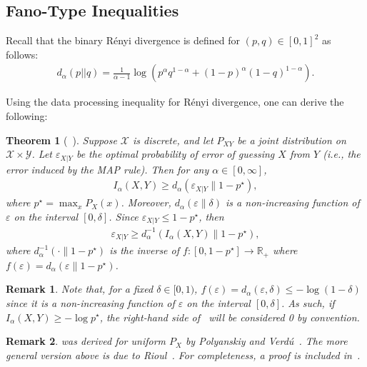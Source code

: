 \documentclass{article}
\newtheorem{theorem}{Theorem}
\numberwithin{theorem}{section}
\numberwithin{example}{section}
\newtheorem{remark}{Remark}
\numberwithin{remark}{section}
\numberwithin{definition}{section}
\newcommand{\X}{\mathcal{X}}
\newcommand{\Y}{\mathcal{Y}}
\newcommand{\eps}{\varepsilon}
\begin{document}
\subsection{Fano-Type Inequalities}\label{sec:fanoTypeIneq}

Recall that the binary R\'enyi divergence is defined for $(p,q) \in [0,1]^2$ as follows:
\begin{align}
    \label{eq:def-binary-renyi}
    d_\alpha(p||q) = \frac{1}{\alpha-1} \log \left( p^\alpha q^{1-\alpha} + (1-p)^\alpha (1-q)^{1-\alpha} \right).
\end{align}

Using the data processing inequality for R\'enyi divergence, one can derive the following:

\begin{theorem}[{~\cite{polyanskiyV:10,Rioul:21}}] \label{thm:fano-alpha}
    Suppose $\X$ is discrete, and let $P_{XY}$ be a joint distribution on $\X \times \Y$. Let $\eps_{X|Y}$ be the optimal probability of error of guessing $X$ from $Y$ (i.e., the error induced by the MAP rule). Then for any $\alpha \in [0,\infty]$,
    \begin{align} \label{eq:thm-fano-alpha}
        I_\alpha(X,Y) \geq d_\alpha \left( \eps_{X|Y} \| 1-p^\star \right),
    \end{align}
    where $p^\star = \max_x P_X(x)$. Moreover, $d_\alpha(\eps \| \delta)$ is a non-increasing function of $\eps$ on the interval $[0,\delta]$. Since $\eps_{X|Y} \leq 1-p^\star$, then
    \begin{align} \label{eq:thm-fano-alpha-2}
        \eps_{X|Y} \geq d_\alpha^{-1} \left( I_\alpha(X,Y) \| 1-p^\star\right),
    \end{align}
    where $d_\alpha^{-1}( \cdot \| 1-p^\star)$ is the inverse of $f: [0,1-p^\star] \rightarrow \mathbb{R}_+$ where $f(\eps) = d_\alpha(\eps \| 1-p^\star)$. 
\end{theorem}
\begin{remark}
    Note that, for a fixed $\delta \in [0,1)$, $f(\eps) = d_\alpha(\eps,\delta) \leq -  \log (1-\delta)$ since it is a non-increasing function of $\eps$ on the interval $[0,\delta]$. As such, if $I_\alpha(X,Y) \geq -\log p^\star$, the right-hand side of~ will be considered 0 by convention.
\end{remark}
\begin{remark}
     was derived for uniform $P_X$ by Polyanskiy and Verd{\'u}~\cite[Theorem 5.3]{polyanskiyV:10}. The more general version above is due to Rioul~\cite[Theorem 1]{Rioul:21}. For completeness, a proof is included in~.
\end{remark}
\end{document}
